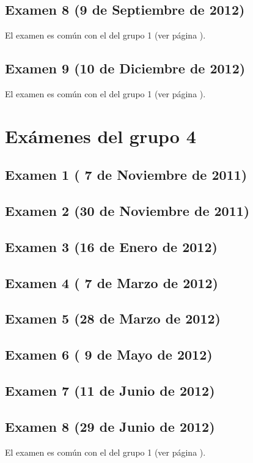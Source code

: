 \documentclass[a4paper,12pt,twoside]{book}
\begin{document}
\section{Examen 8 (9 de Septiembre de 2012)} 
El examen es común con el del grupo 1 (ver página \pageref{examen_11_12_1_9}).
\section{Examen 9 (10 de Diciembre de 2012)} 
El examen es común con el del grupo 1 (ver página \pageref{examen_11_12_1_10}).

\chapter{Exámenes del grupo 4}
\section{Examen 1 ( 7 de Noviembre de 2011)}
\section{Examen 2 (30 de Noviembre de 2011)}
\section{Examen 3 (16 de Enero de 2012)}
\section{Examen 4 ( 7 de Marzo de 2012)}
\section{Examen 5 (28 de Marzo de 2012)}
\section{Examen 6 ( 9 de Mayo de 2012)}
\section{Examen 7 (11 de Junio de 2012)}
\section{Examen 8 (29 de Junio de 2012)} 
El examen es común con el del grupo 1 (ver página \pageref{examen_11_12_1_8}).
\end{document}
